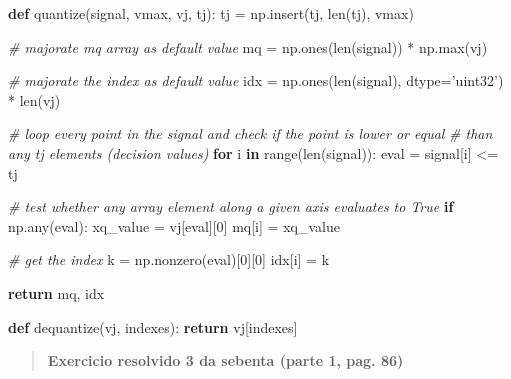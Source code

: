 \documentclass[11pt]{article}
\newenvironment{Shaded}{}{}
\newcommand{\KeywordTok}[1]{\textcolor[rgb]{0.00,0.44,0.13}{\textbf{{#1}}}}
\newcommand{\DecValTok}[1]{\textcolor[rgb]{0.25,0.63,0.44}{{#1}}}
\newcommand{\StringTok}[1]{\textcolor[rgb]{0.25,0.44,0.63}{{#1}}}
\newcommand{\CommentTok}[1]{\textcolor[rgb]{0.38,0.63,0.69}{\textit{{#1}}}}
\newcommand{\NormalTok}[1]{{#1}}
\newcommand{\ControlFlowTok}[1]{\textcolor[rgb]{0.00,0.44,0.13}{\textbf{{#1}}}}
\newcommand{\OperatorTok}[1]{\textcolor[rgb]{0.40,0.40,0.40}{{#1}}}
\newcommand{\BuiltInTok}[1]{{#1}}
\begin{document}
\begin{Shaded}
\begin{Highlighting}[]
\KeywordTok{def} \NormalTok{quantize(signal, vmax, vj, tj):}
    \NormalTok{tj }\OperatorTok{=} \NormalTok{np.insert(tj, }\BuiltInTok{len}\NormalTok{(tj), vmax)}

    \CommentTok{# majorate mq array as default value}
    \NormalTok{mq }\OperatorTok{=} \NormalTok{np.ones(}\BuiltInTok{len}\NormalTok{(signal)) }\OperatorTok{*} \NormalTok{np.}\BuiltInTok{max}\NormalTok{(vj)}

    \CommentTok{# majorate the index as default value}
    \NormalTok{idx }\OperatorTok{=} \NormalTok{np.ones(}\BuiltInTok{len}\NormalTok{(signal), dtype}\OperatorTok{=}\StringTok{'uint32'}\NormalTok{) }\OperatorTok{*} \BuiltInTok{len}\NormalTok{(vj)}

    \CommentTok{# loop every point in the signal and check if the point is lower or equal}
    \CommentTok{# than any tj elements (decision values)}
    \ControlFlowTok{for} \NormalTok{i }\KeywordTok{in} \BuiltInTok{range}\NormalTok{(}\BuiltInTok{len}\NormalTok{(signal)):}
        \BuiltInTok{eval} \OperatorTok{=} \NormalTok{signal[i] }\OperatorTok{<=} \NormalTok{tj}

        \CommentTok{# test whether any array element along a given axis evaluates to True}
        \ControlFlowTok{if} \NormalTok{np.}\BuiltInTok{any}\NormalTok{(}\BuiltInTok{eval}\NormalTok{):}
            \NormalTok{xq_value }\OperatorTok{=} \NormalTok{vj[}\BuiltInTok{eval}\NormalTok{][}\DecValTok{0}\NormalTok{]}
            \NormalTok{mq[i] }\OperatorTok{=} \NormalTok{xq_value}

            \CommentTok{# get the index}
            \NormalTok{k }\OperatorTok{=} \NormalTok{np.nonzero(}\BuiltInTok{eval}\NormalTok{)[}\DecValTok{0}\NormalTok{][}\DecValTok{0}\NormalTok{]}
            \NormalTok{idx[i] }\OperatorTok{=} \NormalTok{k}

    \ControlFlowTok{return} \NormalTok{mq, idx}
\end{Highlighting}
\end{Shaded}

\begin{Shaded}
\begin{Highlighting}[]
\KeywordTok{def} \NormalTok{dequantize(vj, indexes):}
    \ControlFlowTok{return} \NormalTok{vj[indexes]}
\end{Highlighting}
\end{Shaded}

    \begin{quote}
\textbf{Exercicio resolvido 3 da sebenta (parte 1, pag. 86)}
\end{quote}
\end{document}
